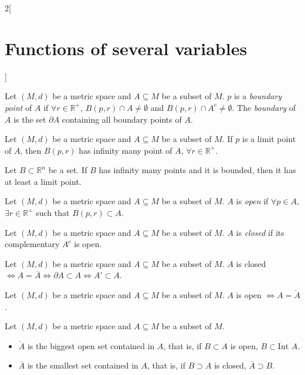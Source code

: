 \documentclass[../../../main.tex]{subfiles}
\begin{document}
\begin{multicols}{2}[\section{Functions of several variables}]
\begin{definition}
Let $(M,d)$ be a metric space and $A\subseteq M$ be a subset of $M$. $p$ is a \textit{boundary point} of $A$ if $\forall r\in\mathbb{R}^+$, $B(p,r)\cap A\ne\emptyset$ and $B(p,r)\cap A^c\ne\emptyset$. The \textit{boundary} of $A$ is the set $\partial A$ containing all boundary points of $A$.
\end{definition}
\begin{prop}
Let $(M,d)$ be a metric space and $A\subseteq M$ be a subset of $M$. If $p$ is a limit point of $A$, then $B(p,r)$ has infinity many point of $A$, $\forall r\in\mathbb{R}^+$.
\end{prop}
\begin{theorem}
Let $B\subset\mathbb{R}^n$ be a set. If $B$ has infinity many points and it is bounded, then it has at least a limit point.
\end{theorem}
\begin{definition}
Let $(M,d)$ be a metric space and $A\subseteq M$ be a subset of $M$. $A$ is \textit{open} if $\forall p\in A$, $\exists r\in\mathbb{R}^+$ such that $B(p,r)\subset A$.
\end{definition}
\begin{definition}
Let $(M,d)$ be a metric space and $A\subseteq M$ be a subset of $M$. $A$ is \textit{closed} if its complementary $A^c$ is open.
\end{definition}
\begin{prop} 
Let $(M,d)$ be a metric space and $A\subseteq M$ be a subset of $M$. $A$ is closed $\iff A=\overline{A}\iff\partial A\subset A\iff A'\subset A$.
\end{prop}
\begin{prop}
Let $(M,d)$ be a metric space and $A\subseteq M$ be a subset of $M$. $A$ is open $\iff A=\mathring A$.
\end{prop}
\begin{prop}
Let $(M,d)$ be a metric space and $A\subseteq M$ be a subset of $M$.
\begin{itemize}
    \item $\mathring A$ is the biggest open set contained in $A$, that is, if $B\subset A$ is open, $B\subset\text{Int }A$.
    \item $\overline{A}$ is the smallest set contained in $A$, that is, if $B\supset A$ is closed, $\overline{A}\supset B$.
\end{itemize}
\end{prop}
\begin{prop}

\end{prop}
\end{multicols}
\end{document}
